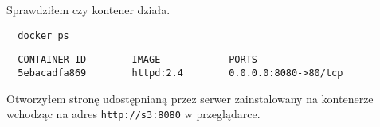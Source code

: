 \documentclass{article} %
\begin{document}
Sprawdziłem czy kontener działa.
\begin{tcolorbox}[colback=yellow!10!white,colframe=red!45!black,coltitle=yellow!100!black, title=Działające kontenery]
  \begin{lstlisting}
  docker ps
  \end{lstlisting}
  \tcblower
  \scriptsize
  \begin{lstlisting}
  CONTAINER ID        IMAGE            PORTS
  5ebacadfa869        httpd:2.4        0.0.0.0:8080->80/tcp
  \end{lstlisting}
\end{tcolorbox}
\normalsize
\vspace{5mm}

Otworzyłem stronę udostępnianą przez serwer zainstalowany na kontenerze wchodząc na adres \texttt{http://s3:8080} w przeglądarce.
\end{document}
